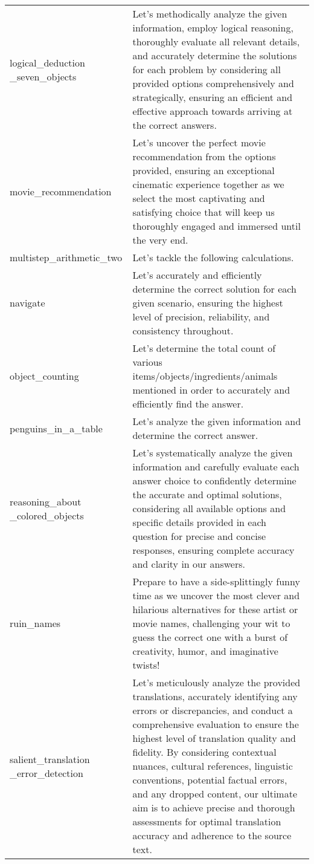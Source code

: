 \begin{table}[H]
\begin{tabular}{P{2.3cm}P{11.6cm}}
logical\_deduction \_seven\_objects & Let's methodically analyze the given information, employ logical reasoning, thoroughly evaluate all relevant details, and accurately determine the solutions for each problem by considering all provided options comprehensively and strategically, ensuring an efficient and effective approach towards arriving at the correct answers. \\ [2ex]
movie\_recommendation & Let's uncover the perfect movie recommendation from the options provided, ensuring an exceptional cinematic experience together as we select the most captivating and satisfying choice that will keep us thoroughly engaged and immersed until the very end. \\ [2ex]
multistep\_arithmetic\_two & Let's tackle the following calculations. \\ [2ex]
navigate & Let's accurately and efficiently determine the correct solution for each given scenario, ensuring the highest level of precision, reliability, and consistency throughout. \\ [2ex]
object\_counting & Let's determine the total count of various items/objects/ingredients/animals mentioned in order to accurately and efficiently find the answer. \\ [2ex]
penguins\_in\_a\_table & Let's analyze the given information and determine the correct answer. \\ [2ex]
reasoning\_about \_colored\_objects & Let's systematically analyze the given information and carefully evaluate each answer choice to confidently determine the accurate and optimal solutions, considering all available options and specific details provided in each question for precise and concise responses, ensuring complete accuracy and clarity in our answers. \\ [2ex]
ruin\_names & Prepare to have a side-splittingly funny time as we uncover the most clever and hilarious alternatives for these artist or movie names, challenging your wit to guess the correct one with a burst of creativity, humor, and imaginative twists! \\ [2ex]
salient\_translation \_error\_detection & Let's meticulously analyze the provided translations, accurately identifying any errors or discrepancies, and conduct a comprehensive evaluation to ensure the highest level of translation quality and fidelity. By considering contextual nuances, cultural references, linguistic conventions, potential factual errors, and any dropped content, our ultimate aim is to achieve precise and thorough assessments for optimal translation accuracy and adherence to the source text. \\ [2ex]

\end{tabular}
\end{table}
